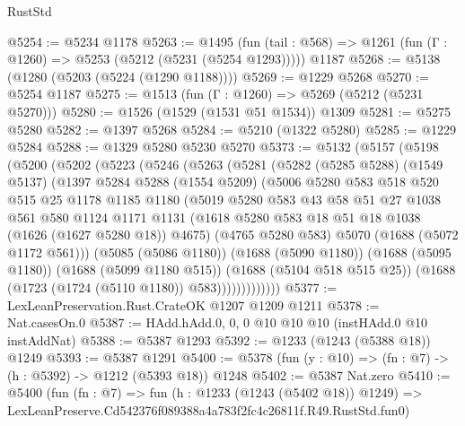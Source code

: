 \begin{lexlean}{RustStd}
\begin{coremodule}
@5254 := @5234 @1178
@5263 := @1495
    (fun (tail : @568) => @1261 (fun (Γ : @1260) => @5253 (@5212 (@5231 (@5254 @1293)))))
    @1187
@5268 := @5138 (@1280 (@5203 (@5224 (@1290 @1188))))
@5269 := @1229 @5268
@5270 := @5254 @1187
@5275 := @1513 (fun (Γ : @1260) => @5269 (@5212 (@5231 @5270)))
@5280 := @1526 (@1529 (@1531 @51 @1534)) @1309
@5281 := @5275 @5280
@5282 := @1397 @5268
@5284 := @5210 (@1322 @5280)
@5285 := @1229 @5284
@5288 := @1329 @5280 @5230 @5270
@5373 := @5132
    (@5157
      (@5198
        (@5200
          (@5202
            (@5223
              (@5246
                (@5263
                  (@5281
                    (@5282
                      (@5285 @5288)
                      (@1549 @5137)
                      (@1397
                        @5284
                        @5288
                        (@1554 @5209)
                        (@5006
                          @5280
                          @583
                          @518
                          @520
                          @515
                          @25
                          @1178
                          @1185
                          @1180
                          (@5019
                            @5280
                            @583
                            @43
                            @58
                            @51
                            @27
                            @1038
                            @561
                            @580
                            @1124
                            @1171
                            @1131
                            (@1618 @5280 @583 @18 @51 @18 @1038 (@1626 (@1627 @5280 @18)) @4675)
                            (@4765 @5280 @583)
                            @5070
                            (@1688 (@5072 @1172 @561)))
                          (@5085 (@5086 @1180))
                          (@1688 (@5090 @1180))
                          (@1688 (@5095 @1180))
                          (@1688 (@5099 @1180 @515))
                          (@1688 (@5104 @518 @515 @25))
                          (@1688 (@1723 (@1724 (@5110 @1180)) @583)))))))))))))
@5377 := LexLeanPreservation.Rust.CrateOK @1207 @1209 @1211
@5378 := Nat.casesOn.{0}
@5387 := HAdd.hAdd.{0, 0, 0} @10 @10 @10 (instHAdd.{0} @10 instAddNat)
@5388 := @5387 @1293
@5392 := @1233 (@1243 (@5388 @18)) @1249
@5393 := @5387 @1291
@5400 := @5378 (fun (y : @10) => (fn : @7) -> (h : @5392) -> @1212 (@5393 @18)) @1248
@5402 := @5387 Nat.zero
@5410 := @5400
    (fun (fn : @7) =>
    fun (h : @1233 (@1243 (@5402 @18)) @1249) =>
    LexLeanPreserve.Cd542376f089388a4a783f2fc4c26811f.R49.RustStd.fun0)

\end{coremodule}
\end{lexlean}
